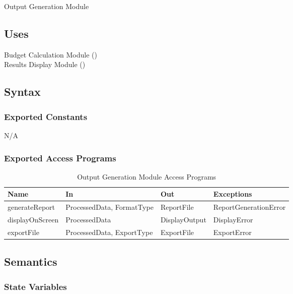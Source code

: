 \documentclass[12pt, titlepage]{article}
\begin{document}
Output Generation Module

\subsection{Uses}

Budget Calculation Module ()\\
Results Display Module ()\\

\subsection{Syntax}

\subsubsection{Exported Constants}

N/A

\subsubsection{Exported Access Programs}

\begin{center}
  \begin{table}[H]
    \caption{Output Generation Module Access Programs}
\begin{tabular}{p{4cm} p{4cm} p{4cm} p{4cm}}
\hline
\textbf{Name} & \textbf{In} & \textbf{Out} & \textbf{Exceptions} \\
\hline
generateReport & ProcessedData, FormatType & ReportFile & ReportGenerationError \\
\hline
displayOnScreen & ProcessedData & DisplayOutput & DisplayError \\
\hline
exportFile & ProcessedData, ExportType & ExportFile & ExportError \\
\hline
\end{tabular}
\end{table}
\end{center}

\subsection{Semantics}

\subsubsection{State Variables}
\end{document}
